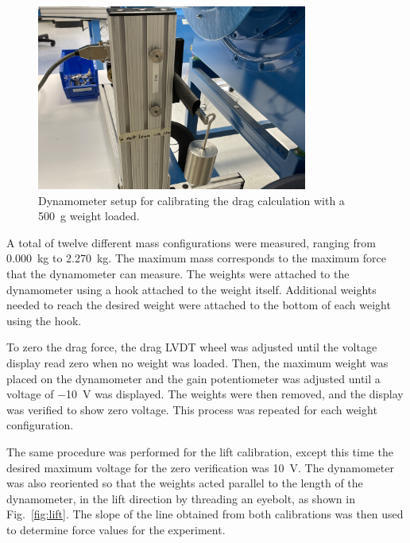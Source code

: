 \documentclass[journal,letterpaper]{IEEEtran}
\begin{document}
\begin{figure}[H]
    \centering
    \includegraphics[width=3.5in]{drag}
    \caption{Dynamometer setup for calibrating the drag calculation with a \qty{500}{\g} weight loaded.}
    \label{fig:drag}
\end{figure}

A total of twelve different mass configurations were measured, ranging from \qty{0.000}{\kg} to \qty{2.270}{\kg}.
The maximum mass corresponds to the maximum force that the dynamometer can measure.
The weights were attached to the dynamometer using a hook attached to the weight itself.
Additional weights needed to reach the desired weight were attached to the bottom of each weight using the hook.

To zero the drag force, the drag LVDT wheel was adjusted until the voltage display read zero when no weight was loaded.
Then, the maximum weight was placed on the dynamometer and the gain potentiometer was adjusted until a voltage of \qty{-10}{\V} was displayed.
The weights were then removed, and the display was verified to show zero voltage.
This process was repeated for each weight configuration.

The same procedure was performed for the lift calibration, except this time the desired maximum voltage for the zero verification was \qty{10}{\V}.
The dynamometer was also reoriented so that the weights acted parallel to the length of the dynamometer, in the lift direction by threading an eyebolt, as shown in Fig.~\ref{fig:lift}.
The slope of the line obtained from both calibrations was then used to determine force values for the experiment.
\end{document}

